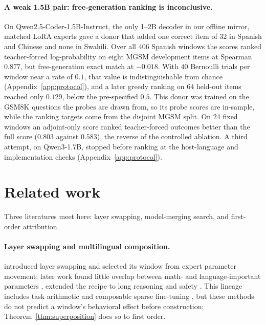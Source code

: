 \documentclass{article}
\theoremstyle{plain}
\theoremstyle{definition}
\theoremstyle{remark}
\begin{document}
\paragraph{A weak 1.5B pair: free-generation ranking is inconclusive.}
On Qwen2.5-Coder-1.5B-Instruct, the only 1--2B decoder in our offline mirror, matched
LoRA experts gave a donor that added one correct item of $32$ in Spanish and
Chinese and none in Swahili. Over all $406$ Spanish windows the scores ranked
teacher-forced log-probability on eight MGSM development items
\citep{shi2022mgsm} at Spearman $0.877$, but free-generation exact match at
$-0.018$. With $40$ Bernoulli trials per window near a rate of $0.1$, that value
is indistinguishable from chance (Appendix~\ref{app:protocol}), and a later
greedy ranking on $64$ held-out items reached only $0.129$, below the
pre-specified $0.5$. This donor was
trained on the GSM8K questions the probes are drawn from, so its probe scores are
in-sample, while the ranking targets come from the disjoint MGSM split. On $24$
fixed windows an adjoint-only score ranked teacher-forced outcomes better than
the full score ($0.803$ against $0.583$), the reverse of the controlled ablation.
A third attempt, on Qwen3-1.7B, stopped before ranking at the host-language and
implementation checks (Appendix~\ref{app:protocol}).

\section{Related work}
\label{sec:related}

Three literatures meet here: layer swapping, model-merging search, and
first-order attribution.

\paragraph{Layer swapping and multilingual composition.}
\citet{bandarkar2025layerswap} introduced layer swapping and selected its window
from expert parameter movement; later work found little overlap between
math- and language-important parameters \citep{bandarkar2025unreasonable},
extended the recipe to long reasoning and safety
\citep{lasbordes2026rethinking, shin2026safetyswap}. This lineage includes task arithmetic and
composable sparse fine-tuning \citep{ilharco2023task, chronopoulou2024langtask,
ansell2022sft}, but these methods do not predict a window's behavioral effect
before construction; Theorem~\ref{thm:superposition} does so to first order.
\end{document}
